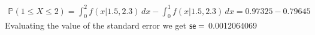 \documentclass[a4paper,10pt]{article}
\theoremstyle{definition}
\begin{document}
\begin{enumerate}
\begin{enumerate}[(a)]
\begin{align*}
\mathbb{P}(1\leq X \leq 2)=\int_{0}^{2}f(x|1.5,2.3)\,dx-\int_{0}^{1}f(x|1.5,2.3)\,dx=0.97325-0.79645%
\end{align*}
Evaluating the value of the standard error we get $\text{\sffamily{se}} =$ 0.0012064069
%
\end{enumerate}
\end{enumerate}
\end{document}
